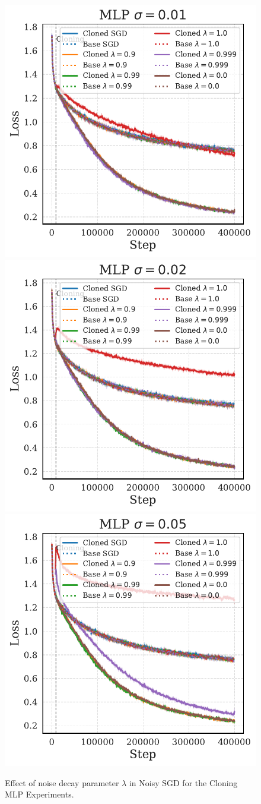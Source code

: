 \documentclass{article}
\numberwithin{figure}{section}
\begin{document}
\begin{figure}
    \centering
    \includegraphics[width=0.3\linewidth]{paper/images/mlp_noises_cloning_losses_plot_lamda_sigma_0.01.pdf}
    \includegraphics[width=0.3\linewidth]{paper/images/mlp_noises_cloning_losses_plot_lamda_sigma_0.02.pdf}
    \includegraphics[width=0.3\linewidth]{paper/images/mlp_noises_cloning_losses_plot_lamda_sigma_0.05.pdf}
    \caption{Effect of noise decay parameter $\lambda$ in Noisy SGD for the Cloning MLP Experiments.}
    \label{fig:enter-label}
\end{figure}
\end{document}
